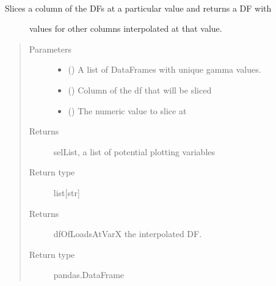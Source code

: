 \documentclass[letterpaper,10pt,openany,oneside,english]{sphinxmanual}
\begin{document}
\begin{fulllineitems}
\label{\detokenize{index:loadPullDataAnalysis.dataXformation.interpolatedSlice}}~\begin{description}
\item[{Slices a column of the DFs at a particular value and returns a DF with}] \leavevmode
\sphinxAtStartPar
values for other columns interpolated at that value.

\end{description}
\begin{quote}\begin{description}
\item[{Parameters}] \leavevmode\begin{itemize}
\item {} 
\sphinxAtStartPar
{} (\sphinxstyleliteralemphasis{\sphinxupquote{{[}}}\sphinxstyleliteralemphasis{\sphinxupquote{{]}}}) \textendash{} A list of DataFrames with unique gamma values.

\item {} 
\sphinxAtStartPar
{} () \textendash{} Column of the df that will be sliced

\item {} 
\sphinxAtStartPar
{} () \textendash{} The numeric value to slice at

\end{itemize}

\item[{Returns}] \leavevmode
\sphinxAtStartPar
selList, a list of potential plotting variables

\item[{Return type}] \leavevmode
\sphinxAtStartPar
list{[}str{]}

\item[{Returns}] \leavevmode
\sphinxAtStartPar
dfOfLoadsAtVarX the interpolated DF.

\item[{Return type}] \leavevmode
\sphinxAtStartPar
pandas.DataFrame

\end{description}\end{quote}

\end{fulllineitems}
\end{document}
